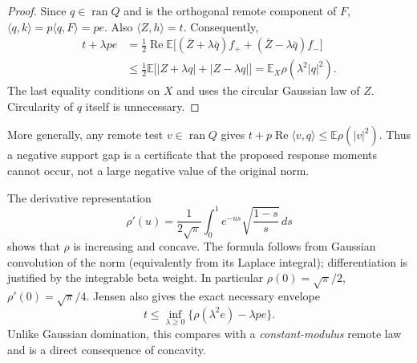 \begin{proof}
Since $q\in\operatorname{ran}Q$ and is the orthogonal remote component of
$F$, $\langle q,k\rangle=p\langle q,F\rangle=pe$.
Also $\langle Z,h\rangle=t$. Consequently,
\begin{align*}
 t+\lambda pe
 &=\frac12\operatorname{Re}\mathbb E\bigl[
    (\bar Z+\lambda\bar q)f_+
   +(\bar Z-\lambda\bar q)f_-\bigr]\\
 &\le\frac12\mathbb E\bigl[|Z+\lambda q|+|Z-\lambda q|\bigr]
 =\mathbb E_X\rho(\lambda^2|q|^2).
\end{align*}
The last equality conditions on $X$ and uses the circular Gaussian law
of $Z$. Circularity of $q$ itself is unnecessary.
\end{proof}

More generally, any remote test $v\in\operatorname{ran}Q$ gives
$t+p\operatorname{Re}\langle v,q\rangle\le\mathbb E\rho(|v|^2)$.
Thus a negative support gap is a certificate that the proposed response
moments cannot occur, not a large negative value of the original norm.

The derivative representation
\begin{equation}\label{eq:unit-rice-derivative}
 \rho'(u)=\frac1{2\sqrt\pi}\int_0^1
       e^{-us}\sqrt{\frac{1-s}{s}}\,ds
\end{equation}
shows that $\rho$ is increasing and concave. The formula follows from
Gaussian convolution of the norm (equivalently from its Laplace integral);
differentiation is justified by the integrable beta weight.
In particular $\rho(0)=\sqrt\pi/2$, $\rho'(0)=\sqrt\pi/4$.
Jensen also gives the exact necessary envelope
\[
 t\le\inf_{\lambda\ge0}
       \{\rho(\lambda^2e)-\lambda pe\}.
\]
Unlike Gaussian domination, this compares with a \emph{constant-modulus}
remote law and is a direct consequence of concavity.

